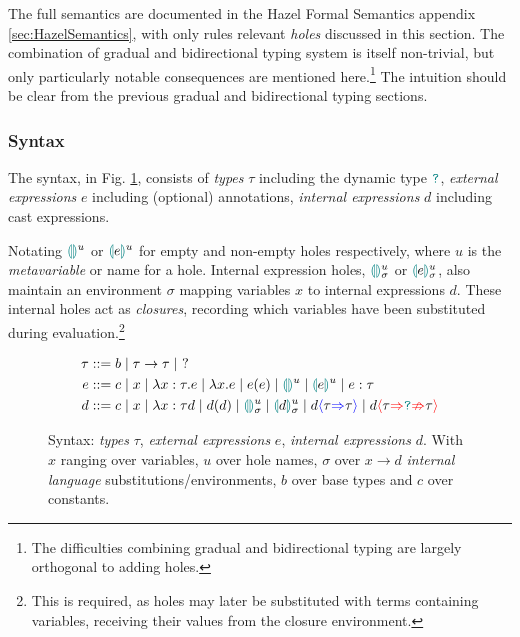 The full semantics are documented in the Hazel Formal Semantics appendix \ref{sec:HazelSemantics}, with only rules relevant \textit{holes} discussed in this section. The combination of gradual and bidirectional typing system is itself non-trivial, but only particularly notable consequences are mentioned here.\footnote{The difficulties combining gradual and bidirectional typing are largely orthogonal to adding holes.} The intuition should be clear from the previous gradual and bidirectional typing sections.

\subsubsection{Syntax}\label{sec:HazelSyntax}
\par The syntax, in Fig. \ref{fig:syntax}, consists of \textit{types} $\tau$ including the dynamic type $\dyn$, \textit{external expressions} $e$ including (optional) annotations, \textit{internal expressions} $d$ including cast expressions.

Notating $\hole{}^u$ or $\hole[e]^u$ for empty and non-empty holes respectively, where $u$ is the \textit{metavariable} or name for a hole. Internal expression holes, $\hole{}^u_\sigma$ or $\hole[e]^u_\sigma$, also maintain an environment $\sigma$ mapping variables $x$ to internal expressions $d$. These internal holes act as \textit{closures}, recording which variables have been substituted during evaluation.\footnote{This is required, as holes may later be substituted with terms containing variables, receiving their values from the closure environment.}
\begin{figure}[h]
\begin{align*}
\tau &::= b \mid \tau \to \tau \mid\  ?\\
e &::= c \mid x \mid \lambda x : \tau.e \mid \lambda x. e \mid e(e) \mid \hole^u \mid \hole[e]^u \mid e : \tau\\
d &::= c \mid x \mid \lambda x : \tau d \mid d(d) \mid \hole^u_\sigma \mid \hole[d]^u_\sigma \mid d\scast{\tau}{\tau} \mid d\scasterror{\tau}{\tau}
\end{align*}
\caption{Syntax: \textit{types} $\tau$, \textit{external expressions} $e$, \textit{internal expressions} $d$. With $x$ ranging over variables, $u$ over hole names, $\sigma$ over $x \to d$ \textit{internal language} substitutions/environments, $b$ over base types and $c$ over constants.}
\label{fig:syntax}
\end{figure}


